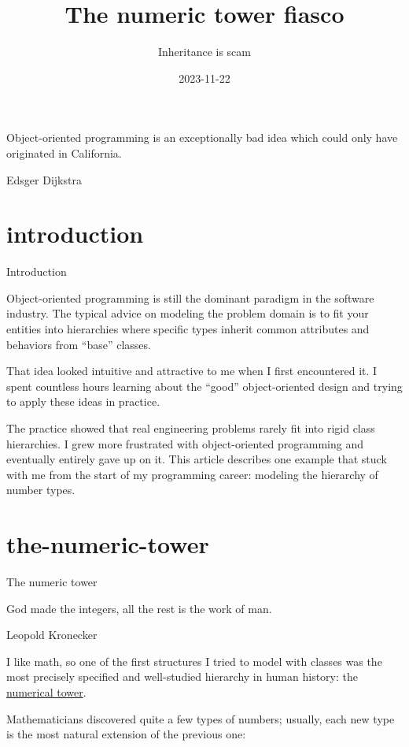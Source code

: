 \documentclass{article}
\title{The numeric tower fiasco}
\subtitle{Inheritance is scam}
\date{2023-11-22}
\begin{document}
\epigraph{Object-oriented programming is an exceptionally bad idea which could only have originated in California.}{Edsger Dijkstra}

\section{introduction}{Introduction}

Object-oriented programming is still the dominant paradigm in the software industry.
The typical advice on modeling the problem domain is to fit your entities into hierarchies where specific types inherit common attributes and behaviors from ``base'' classes.

That idea looked intuitive and attractive to me when I first encountered it.
I spent countless hours learning about the ``good'' object-oriented design and trying to apply these ideas in practice.

The practice showed that real engineering problems rarely fit into rigid class hierarchies.
I grew more frustrated with object-oriented programming and eventually entirely gave up on it.
This article describes one example that stuck with me from the start of my programming career: modeling the hierarchy of number types.

\section{the-numeric-tower}{The numeric tower}

\epigraph{God made the integers, all the rest is the work of man.}{Leopold Kronecker}

I like math, so one of the first structures I tried to model with classes was the most precisely specified and well-studied hierarchy in human history: the \href{https://en.wikipedia.org/wiki/Numerical_tower}{numerical tower}.

Mathematicians discovered quite a few types of numbers; usually, each new type is the most natural extension of the previous one:
\end{document}
